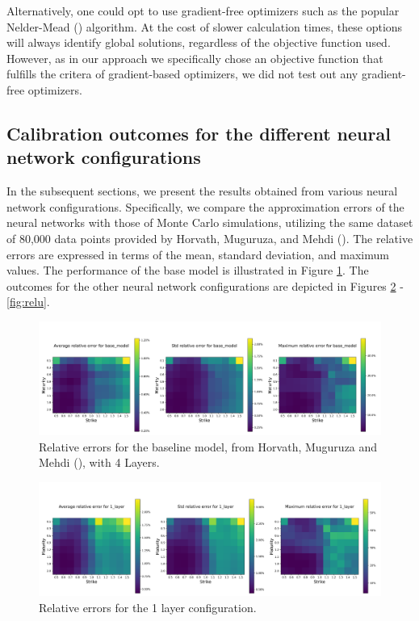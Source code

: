 \documentclass{article}
\theoremstyle{remark}
\begin{document}
Alternatively, one could opt to use gradient-free optimizers such as the popular Nelder-Mead (\cite{NelderMead}) algorithm.
At the cost of slower calculation times, these options will always identify global solutions, regardless of the objective function used.
However, as in our approach we specifically chose an objective function that fulfills the critera of gradient-based optimizers,
we did not test out any gradient-free optimizers.

\subsection{Calibration outcomes for the different neural network configurations}
\label{sec:outcomes}
In the subsequent sections, we present the results obtained from various neural network configurations.
Specifically, we compare the approximation errors of the neural networks with those of Monte Carlo simulations,
utilizing the same dataset of 80,000 data points provided by Horvath, Muguruza, and Mehdi (\cite{HMM19}).
The relative errors are expressed in terms of the mean, standard deviation, and maximum values.
The performance of the base model is illustrated in Figure \ref{fig:base_model}.
The outcomes for the other neural network configurations are depicted in Figures \ref{fig:1_layer} - \ref{fig:relu}.

\begin{figure}[h!]
  \centering
  \includegraphics[width=\linewidth]{../data/rBergomiTermStructureNNErrors_Model_base_model_1.png}
  \caption{Relative errors for the baseline model, from Horvath, Muguruza and Mehdi (\cite{HMM19}), with 4 Layers.}
  \label{fig:base_model}
\end{figure}

\begin{figure}[h!]
  \centering
  \includegraphics[width=\linewidth]{../data/rBergomiTermStructureNNErrors_Model_1_layer_5.png}
  \caption{Relative errors for the 1 layer configuration.}
  \label{fig:1_layer}
\end{figure}
\end{document}
